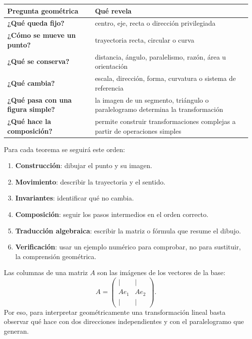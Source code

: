 \begin{center}
\begin{tabularx}{\textwidth}{>{\bfseries}p{38mm} X}
\toprule
Pregunta geométrica & Qué revela\\
\midrule
¿Qué queda fijo? & centro, eje, recta o dirección privilegiada\\
¿Cómo se mueve un punto? & trayectoria recta, circular o curva\\
¿Qué se conserva? & distancia, ángulo, paralelismo, razón, área u orientación\\
¿Qué cambia? & escala, dirección, forma, curvatura o sistema de referencia\\
¿Qué pasa con una figura simple? & la imagen de un segmento, triángulo o paralelogramo
determina la transformación\\
¿Qué hace la composición? & permite construir transformaciones complejas a partir de
operaciones simples\\
\bottomrule
\end{tabularx}
\end{center}

\begin{idea}
Para cada teorema se seguirá este orden:
\begin{enumerate}
  \item \textbf{Construcción}: dibujar el punto y su imagen.
  \item \textbf{Movimiento}: describir la trayectoria y el sentido.
  \item \textbf{Invariantes}: identificar qué no cambia.
  \item \textbf{Composición}: seguir los pasos intermedios en el orden correcto.
  \item \textbf{Traducción algebraica}: escribir la matriz o fórmula que resume el dibujo.
  \item \textbf{Verificación}: usar un ejemplo numérico para comprobar, no para sustituir,
  la comprensión geométrica.
\end{enumerate}
\end{idea}

\begin{resultado}
Las columnas de una matriz \(A\) son las imágenes de los vectores de la base:
\[
  A=
  \begin{pmatrix}\vert&\vert\\Ae_1&Ae_2\\\vert&\vert\end{pmatrix}.
\]
Por eso, para interpretar geométricamente una transformación lineal basta observar qué hace
con dos direcciones independientes y con el paralelogramo que generan.
\end{resultado}


